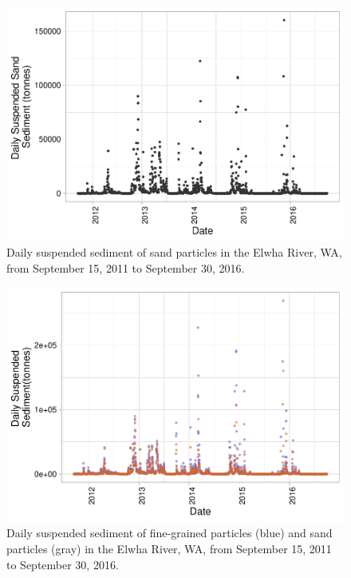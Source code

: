 \documentclass[12pt,]{article}
\begin{document}
\begin{figure}
\centering
\includegraphics{Mason_ENV872_ProjectFinal_files/figure-latex/Exploratory Analysis Figure 4-1.pdf}
\caption{Daily suspended sediment of sand particles in the Elwha River,
WA, from September 15, 2011 to September 30, 2016.}
\end{figure}

\begin{figure}
\centering
\includegraphics{Mason_ENV872_ProjectFinal_files/figure-latex/Exploratory Analysis Figure 5-1.pdf}
\caption{Daily suspended sediment of fine-grained particles (blue) and
sand particles (gray) in the Elwha River, WA, from September 15, 2011 to
September 30, 2016.}
\end{figure}

\newpage
\end{document}
